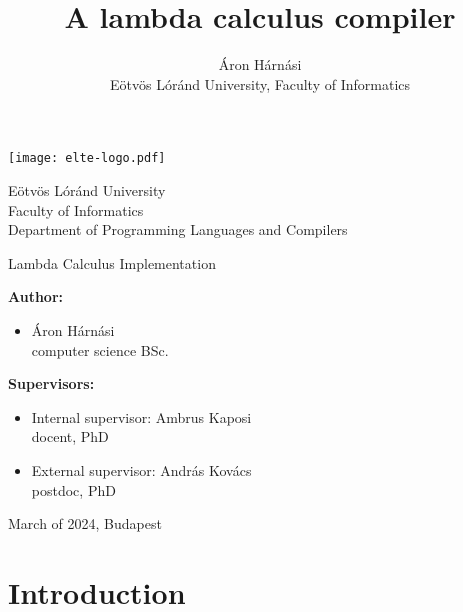 \documentclass[12pt]{article}
\title{A lambda calculus compiler}
\author{Áron Hárnási \\
    \normalsize Eötvös Lóránd University, Faculty of Informatics}
\begin{document}
\linespread{1}
\begin{titlingpage}
\begin{center}
\begin{minipage}{0.25\textwidth}
    \texttt{[image: elte-logo.pdf]}
\end{minipage}
\hspace{2em}
\begin{minipage}{0.65\textwidth}
    Eötvös Lóránd University\\
    Faculty of Informatics\\
    Department of Programming Languages and Compilers
\end{minipage}
\end{center}
\begin{minipage}[c][37em][c]{\textwidth}
    \begin{center}
    \huge Lambda Calculus Implementation
    \end{center}
\end{minipage}

\begin{minipage}[t]{0.45\textwidth}
    \textbf{Author:}
    \begin{itemize}
        \item Áron Hárnási\\
        computer science BSc.
    \end{itemize}
\end{minipage}
\begin{minipage}[t]{0.50\textwidth}
    \textbf{Supervisors:}
    \begin{itemize}
        \item Internal supervisor: Ambrus Kaposi\\
        docent, PhD
        \item External supervisor: András Kovács\\
        postdoc, PhD
    \end{itemize}
\end{minipage}
\vspace{1em}
\begin{center}
    March of 2024, Budapest
\end{center}
\end{titlingpage}
\pagebreak
\tableofcontents
\pagebreak

\section{Introduction}
\end{document}
